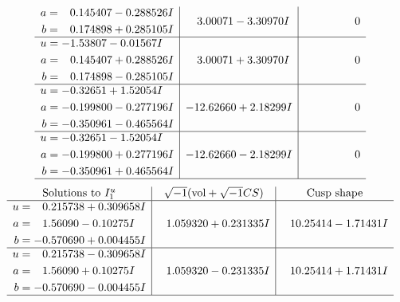 \documentclass[1p]{elsarticle_modified}
\theoremstyle{definition}
\newcommand{\I}{\sqrt{-1}}
\begin{document}
$$\begin{array}{c|c|c}
\begin{aligned}
a &= \phantom{-}0.145407 - 0.288526 I \\
b &= \phantom{-}0.174898 + 0.285105 I\end{aligned}
 & \phantom{-}3.00071 - 3.30970 I & \phantom{-0.000000 } 0 \\ \hline\begin{aligned}
u &= -1.53807 - 0.01567 I \\
a &= \phantom{-}0.145407 + 0.288526 I \\
b &= \phantom{-}0.174898 - 0.285105 I\end{aligned}
 & \phantom{-}3.00071 + 3.30970 I & \phantom{-0.000000 } 0 \\ \hline\begin{aligned}
u &= -0.32651 + 1.52054 I \\
a &= -0.199800 - 0.277196 I \\
b &= -0.350961 - 0.465564 I\end{aligned}
 & -12.62660 + 2.18299 I & \phantom{-0.000000 } 0 \\ \hline\begin{aligned}
u &= -0.32651 - 1.52054 I \\
a &= -0.199800 + 0.277196 I \\
b &= -0.350961 + 0.465564 I\end{aligned}
 & -12.62660 - 2.18299 I & \phantom{-0.000000 } 0\\
 \hline 
 \end{array}$$\newpage$$\begin{array}{c|c|c}  
\text{Solutions to }I^u_{1}& \I (\text{vol} + \sqrt{-1}CS) & \text{Cusp shape}\\
 \hline 
\begin{aligned}
u &= \phantom{-}0.215738 + 0.309658 I \\
a &= \phantom{-}1.56090 - 0.10275 I \\
b &= -0.570690 + 0.004455 I\end{aligned}
 & \phantom{-}1.059320 + 0.231335 I & \phantom{-}10.25414 - 1.71431 I \\ \hline\begin{aligned}
u &= \phantom{-}0.215738 - 0.309658 I \\
a &= \phantom{-}1.56090 + 0.10275 I \\
b &= -0.570690 - 0.004455 I\end{aligned}
 & \phantom{-}1.059320 - 0.231335 I & \phantom{-}10.25414 + 1.71431 I\\
 \hline 
 \end{array}$$\newpage\newpage\renewcommand{\arraystretch}{1}
\end{document}

